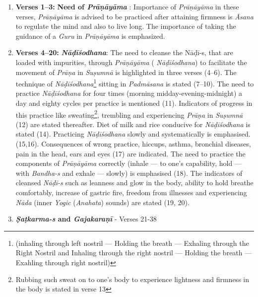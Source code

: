 \begin{enumerate}
\item \textbf{Verses 1--3:} \textbf{Need of \textit{Prāṇāyāma}} : Importance of \textit{Prāṇāyāma} in these verses, \textit{Prāṇāyāma} is advised  to be practiced after attaining  firmness is \textit{Āsana} to regulate the mind  and also to live long. The importance of taking the guidance of a \textit{Guru} in \textit{Prāṇāyāma} is emphasized.  

\item \textbf{Verses 4--20:} \textbf{\textit{Nāḍīśodhana}}: The need to cleanse the Nāḍī-s, that are loaded with impurities, through \textit{Prāṇāyāma} ( \textit{Nāḍīśodhana}) to facilitate the movement of \textit{Prāṇa} in \textit{Suṣumnā} is highlighted in three verses (4--6). The technique of \textit{Nāḍīśodhana}\footnote{(inhaling through left nostril --- Holding the breath --- Exhaling through the Right Nostril and Inhaling through the right nostril --- Holding the breath --- Exahling through right nostril)} sitting in \textit{Padmāsana} is stated (7--10). The need to practice \textit{Nāḍīśodhana} for four times (morning midday-evening-midnight) a day and eighty cycles per practice is mentioned (11). Indicators of progress in this practice like sweating\footnote{Rubbing such sweat on to one’s body to experience lightness and firmness in the body is stated in verse 13}, trembling and experiencing \textit{Prāṇa} in \textit{Suṣumnā} (12) are stated thereafter. Diet of milk and rice conducive for \textit{Nāḍīśodhana} is stated (14). Practicing \textit{Nāḍīśodhana} slowly and systematically is emphasised. (15,16).  Consequences of wrong practice, hiccups, asthma, bronchial diseases, pain in the head, ears and eyes (17) are indicated. The need to practice the components of \textit{Prāṇāyāma} correctly (inhale --- to one’s capability, hold --- with \textit{Bandha-s}  and exhale --- slowly) is emphasised (18).  The indicators of cleansed \textit{Nāḍī-s} such as leanness and glow in the body, ability to hold breathe comfortably, increase of gastric fire, freedom from illnesses and experiencing \textit{Nāda} (inner \textit{Yogic} (\textit{Anahata}) sounds) are stated (19, 20).

\newpage
\item \textbf{\textit{Ṣaṭkarma-s} and \textit{Gajakaraṇī}} - Verses  21-38


\end{enumerate}
